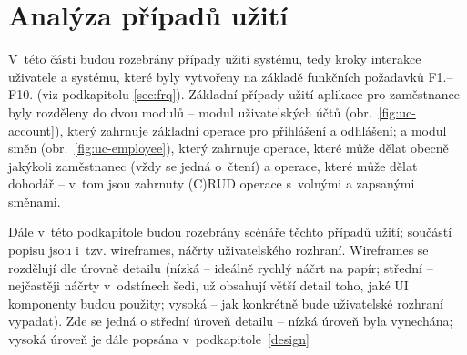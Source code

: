 \documentclass[twoside]{ctuthesis}
\begin{document}
%
%

\newpage
\section{Analýza případů užití}\label{uc-analysis}
V~této části budou rozebrány případy užití systému, tedy kroky interakce uživatele a systému, které byly vytvořeny na základě funkčních požadavků F1.--F10. (viz podkapitolu \ref{sec:frq}). Základní případy užití aplikace pro zaměstnance byly rozděleny do dvou modulů -- modul uživatelských účtů (obr.~\ref{fig:uc-account}), který zahrnuje základní operace pro přihlášení a odhlášení; a modul směn (obr.~\ref{fig:uc-employee}), který zahrnuje operace, které může dělat obecně jakýkoli zaměstnanec (vždy se jedná o~čtení) a operace, které může dělat dohodář -- v~tom jsou zahrnuty (C)RUD operace s~volnými a zapsanými směnami.

Dále v~této podkapitole budou rozebrány scénáře těchto případů užití; součástí popisu jsou i~tzv. wireframes, náčrty uživatelského rozhraní. Wi\-re\-fra\-mes se rozdělují dle úrovně detailu (nízká -- ideálně rychlý náčrt na papír; střední -- nejčastěji náčrty v~odstínech šedi, už obsahují větší detail toho, jaké UI komponenty budou použity; vysoká -- jak konkrétně bude uživatelské rozhraní vypadat). \cite{lazarova2020low} Zde se jedná o střední úroveň detailu -- nízká úroveň byla vynechána; vysoká úroveň je dále popsána v~podkapitole~\ref{design}
\end{document}
